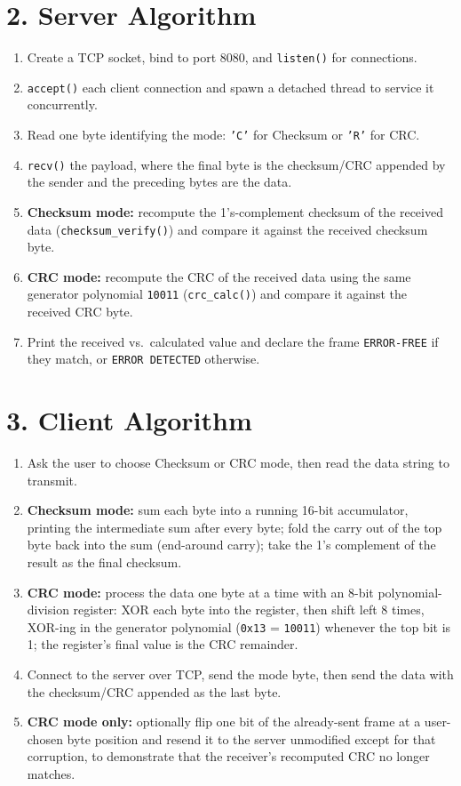 \documentclass[11pt]{article}
\begin{document}
\section*{2. Server Algorithm}
\begin{enumerate}
  \item Create a TCP socket, bind to port 8080, and \texttt{listen()} for connections.
  \item \texttt{accept()} each client connection and spawn a detached thread to service it
        concurrently.
  \item Read one byte identifying the mode: \texttt{'C'} for Checksum or \texttt{'R'} for CRC.
  \item \texttt{recv()} the payload, where the final byte is the checksum/CRC appended by the
        sender and the preceding bytes are the data.
  \item \textbf{Checksum mode:} recompute the 1's-complement checksum of the received data
        (\texttt{checksum\_verify()}) and compare it against the received checksum byte.
  \item \textbf{CRC mode:} recompute the CRC of the received data using the same generator
        polynomial \texttt{10011} (\texttt{crc\_calc()}) and compare it against the received CRC
        byte.
  \item Print the received vs.\ calculated value and declare the frame \texttt{ERROR-FREE} if they
        match, or \texttt{ERROR DETECTED} otherwise.
\end{enumerate}

\section*{3. Client Algorithm}
\begin{enumerate}
  \item Ask the user to choose Checksum or CRC mode, then read the data string to transmit.
  \item \textbf{Checksum mode:} sum each byte into a running 16-bit accumulator, printing the
        intermediate sum after every byte; fold the carry out of the top byte back into the sum
        (end-around carry); take the 1's complement of the result as the final checksum.
  \item \textbf{CRC mode:} process the data one byte at a time with an 8-bit polynomial-division
        register: XOR each byte into the register, then shift left 8 times, XOR-ing in the
        generator polynomial (\texttt{0x13} = \texttt{10011}) whenever the top bit is 1; the
        register's final value is the CRC remainder.
  \item Connect to the server over TCP, send the mode byte, then send the data with the
        checksum/CRC appended as the last byte.
  \item \textbf{CRC mode only:} optionally flip one bit of the already-sent frame at a
        user-chosen byte position and resend it to the server unmodified except for that
        corruption, to demonstrate that the receiver's recomputed CRC no longer matches.
\end{enumerate}
\end{document}
